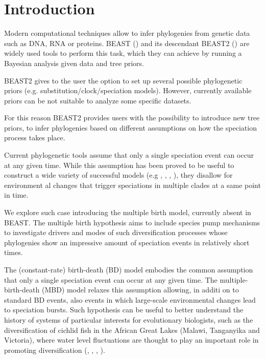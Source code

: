 \section{Introduction}

Modern computational techniques allow to infer phylogenies from genetic data 
such as DNA, RNA or proteins. BEAST (\cite{beast}) and its descendant 
BEAST2 (\cite{beast2}) are widely used tools to perform this task, which they 
can achieve by running a Bayesian analysis given data and tree priors.

BEAST2 gives to the user the option to set up several possible phylogenetic 
priors (e.g. substitution/clock/speciation models). However, currently 
available priors can be not suitable to analyze some specific datasets.

For this reason BEAST2 provides users with the possibility to introduce new 
tree priors, to infer phylogenies based on different assumptions on how the 
speciation process takes place.

Current phylogenetic tools assume that only a single speciation event can occur 
at any given time.
While this assumption has been proved to be useful to construct a wide 
variety of successful models (e.g \cite{Maddison2007biSSE}, 
\cite{Valente2015}, \cite{etienne2012diversity}, \cite{etienne2014estimating}), 
they disallow for environment
al changes that trigger speciations in multiple clades at a same point in time. 

We explore such case introducing the multiple birth model, currently absent 
in BEAST. The multiple birth hypothesis aims to include species pump 
mechanisms to investigate drivers and modes of such diversification processes 
whose phylogenies show an impressive amount of speciation events 
in relatively short times.

The (constant-rate) birth-death (BD) model embodies the common assumption that 
only a single speciation event can occur at any given time. The 
multiple-birth-death (MBD) model relaxes this assumption allowing, in additi
on to standard BD events, also events in which large-scale environmental 
changes lead to speciation bursts.
Such hypothesis can be useful to better understand the history of systems of 
particular interests for evolutionary biologists, such as the 
diversification of cichlid fish in the African Great Lakes (Malawi, 
Tanganyika and Victoria), where 
water level fluctuations are thought to play an important role in promoting 
diversification (\citep{verheyen1996mitochondrial}, \citep{sturmbauer2001lake}, 
\citep{janzen2016}, \citep{janzen2017}).

